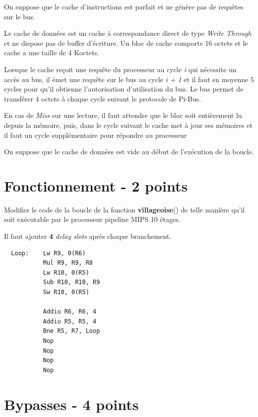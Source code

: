 On suppose que le cache d'instructions est parfait et ne g\'en\`ere pas de
requ\^etes sur le bus.

Le cache de donn\'ees est un cache \`a correspondance direct de type
\textit{Write Through} et ne dispose pas de buffer d'\'ecriture. Un bloc
de cache comporte 16 octets et le cache a une taille de 4 Koctets.

Lorsque le cache re\c{c}oit une requ\^ete du processeur au cycle \textit{i}
qui n\'ecessite un acc\`es au bus, il \'emet une requ\^ete sur le bus au
cycle \textit{i + 1} et il faut en moyenne 5 cycles pour qu'il obtienne
l'autorisation d'utilisation du bus. Le bus permet de transf\'erer 4 octets
\`a chaque cycle suivant le protocole de Pi-Bus.

En cas de \textit{Miss} sur une lecture, il faut attendre que le bloc soit
enti\`erement lu depuis la m\'emoire, puis, dans le cycle suivant le cache
met \`a jour ses m\'emoires et il faut un cycle suppl\'ementaire pour
r\'epondre au processeur

On suppose que le cache de donn\'ees est vide au d\'ebut de l'ex\'ecution
de la boucle.

%
%

\section{Fonctionnement - 2 points}

Modifier le code de la boucle de la fonction \textbf{villageoise}() de telle
mani\`ere qu'il soit ex\'ecutable par le processeur pipeline MIPS 10 \'etages.

\begin{correction}

  Il faut ajouter \textbf{4} \textit{delay slots} apr\`es chaque
  branchement.

  \begin{verbatim}
  Loop:    Lw R9, 0(R6)
           Mul R9, R9, R8
           Lw R10, 0(R5)
           Sub R10, R10, R9
           Sw R10, 0(R5)

           Addiu R6, R6, 4
           Addiu R5, R5, 4
           Bne R5, R7, Loop
           Nop
           Nop
           Nop
           Nop
  \end{verbatim}

\end{correction}

%
%

\section{Bypasses - 4 points}


